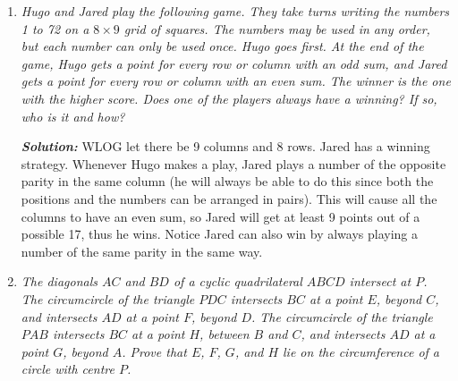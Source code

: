 \documentclass[12pt]{article}
\newcommand{\sol}{\textbf{\textit{Solution: }}}
\begin{document}
\begin{enumerate}[topsep=2\bigskipamount,itemsep=\bigskipamount]
\item \textit{Hugo and Jared play the following game. They take turns writing the numbers 1 to 72 on a $8 \times 9$ grid of squares. The numbers may be used in any order, but each number can only be used once. Hugo goes first. At the end of the game, Hugo gets a point for every row or column with an odd sum, and Jared gets a point for every row or column with an even sum. The winner is the one with the higher score. Does one of the players always have a winning? If so, who is it and how?}

\sol WLOG let there be 9 columns and 8 rows. Jared has a winning strategy. Whenever Hugo makes a play, Jared plays a number of the opposite parity in the same column (he will always be able to do this since both the positions and the numbers can be arranged in pairs). This will cause all the columns to have an even sum, so Jared will get at least 9 points out of a possible 17, thus he wins.
Notice Jared can also win by always playing a number of the same parity in the same way.

\item \textit{The diagonals $AC$ and $BD$ of a cyclic quadrilateral $ABCD$ intersect at $P$. The circumcircle of the triangle $PDC$ intersects $BC$ at a point $E$, beyond $C$, and intersects $AD$ at a point $F$, beyond $D$. The circumcircle of the triangle $PAB$ intersects $BC$ at a point $H$, between $B$ and $C$, and intersects $AD$ at a point $G$, beyond $A$. Prove that $E$, $F$, $G$, and $H$ lie on the circumference of a circle with centre $P$.}


\end{enumerate}
\end{document}
